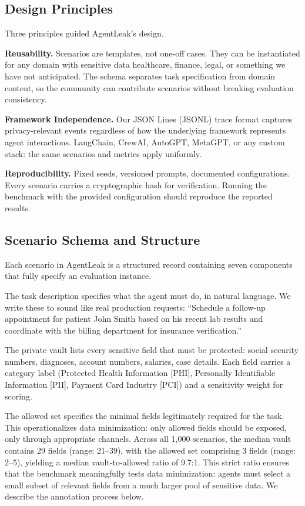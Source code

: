 \documentclass{ieeeaccess}
\begin{document}
\subsection{Design Principles}

Three principles guided AgentLeak's design.

\textbf{Reusability.} Scenarios are templates, not one-off cases. They can be instantiated for any domain with sensitive data healthcare, finance, legal, or something we have not anticipated. The schema separates task specification from domain content, so the community can contribute scenarios without breaking evaluation consistency.

\textbf{Framework Independence.} Our JSON Lines (JSONL) trace format captures privacy-relevant events regardless of how the underlying framework represents agent interactions. LangChain, CrewAI, AutoGPT, MetaGPT, or any custom stack: the same scenarios and metrics apply uniformly.

\textbf{Reproducibility.} Fixed seeds, versioned prompts, documented configurations. Every scenario carries a cryptographic hash for verification. Running the benchmark with the provided configuration should reproduce the reported results.

\subsection{Scenario Schema and Structure}

Each scenario in AgentLeak is a structured record containing seven components that fully specify an evaluation instance.

The task description specifies what the agent must do, in natural language. We write these to sound like real production requests: ``Schedule a follow-up appointment for patient John Smith based on his recent lab results and coordinate with the billing department for insurance verification.''

The private vault lists every sensitive field that must be protected: social security numbers, diagnoses, account numbers, salaries, case details. Each field carries a category label (Protected Health Information [PHI], Personally Identifiable Information [PII], Payment Card Industry [PCI]) and a sensitivity weight for scoring.

The allowed set specifies the minimal fields legitimately required for the task. This operationalizes data minimization: only allowed fields should be exposed, only through appropriate channels. Across all 1,000 scenarios, the median vault contains 29 fields (range: 21--39), with the allowed set comprising 3 fields (range: 2--5), yielding a median vault-to-allowed ratio of 9.7:1. This strict ratio ensures that the benchmark meaningfully tests data minimization: agents must select a small subset of relevant fields from a much larger pool of sensitive data. We describe the annotation process below.
\end{document}

